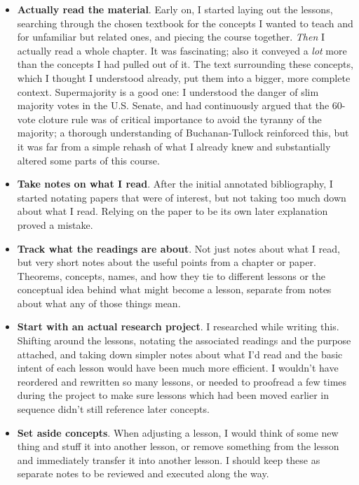 \begin{itemize}
    \item \textbf{Actually read the material}.  Early on, I started laying out the lessons, searching through the chosen textbook for the concepts I wanted to teach and for unfamiliar but related ones, and piecing the course together.  \textit{Then} I actually read a whole chapter.  It was fascinating; also it conveyed a \textit{lot} more than the concepts I had pulled out of it.  The text surrounding these concepts, which I thought I understood already, put them into a bigger, more complete context.  Supermajority is a good one:  I understood the danger of slim majority votes in the U.S. Senate, and had continuously argued that the 60-vote cloture rule was of critical importance to avoid the tyranny of the majority; a thorough understanding of Buchanan-Tullock reinforced this, but it was far from a simple rehash of what I already knew and substantially altered some parts of this course.

    \item \textbf{Take notes on what I read}.  After the initial annotated bibliography, I started notating papers that were of interest, but not taking too much down about what I read.  Relying on the paper to be its own later explanation proved a mistake.

    \item \textbf{Track what the readings are about}.  Not just notes about what I read, but very short notes about the useful points from a chapter or paper.  Theorems, concepts, names, and how they tie to different lessons or the conceptual idea behind what might become a lesson, separate from notes about what any of those things mean.

    \item \textbf{Start with an actual research project}.  I researched while writing this.  Shifting around the lessons, notating the associated readings and the purpose attached, and taking down simpler notes about what I'd read and the basic intent of each lesson would have been much more efficient.  I wouldn't have reordered and rewritten so many lessons, or needed to proofread a few times during the project to make sure lessons which had been moved earlier in sequence didn't still reference later concepts.

    \item \textbf{Set aside concepts}.  When adjusting a lesson, I would think of some new thing and stuff it into another lesson, or remove something from the lesson and immediately transfer it into another lesson.  I should keep these as separate notes to be reviewed and executed along the way.
\end{itemize}